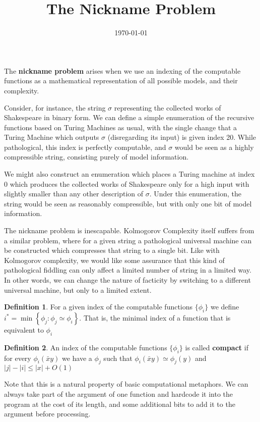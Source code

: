 \documentclass{article}
\title{The Nickname Problem}
\date{\today}
\theoremstyle{definition}
\newtheorem*{dfn}{Definition}
\begin{document}
\maketitle
The \textbf{nickname problem} arises when we use an indexing of the computable functions as a mathematical representation of all possible models, and their complexity. 

Consider, for instance, the string $\sigma$ representing the collected works of Shakespeare in binary form. We can define a simple enumeration of the recursive functions based on Turing Machines as usual, with the single change that a Turing Machine which outputs $\sigma$ (disregarding its input) is given index 20. While pathological, this index is perfectly computable, and $\sigma$ would be seen as a highly compressible string, consisting purely of model information. 

We might also construct an enumeration which places a Turing machine at index 0 which produces the collected works of Shakespeare only for a high input with slightly smaller than any other description of $\sigma$. Under this enumeration, the string would be seen as reasonably compressible, but with only one bit of model information.

The nickname problem is inescapable. Kolmogorov Complexity itself suffers from a similar problem, where for a given string a pathological universal machine can be constructed which compresses that string to a single bit. Like with Kolmogorov complexity, we would like some assurance that this kind of pathological fiddling can only affect a limited number of string in a limited way. In other words, we can change the nature of facticity by switching to a different universal machine, but only to a limited extent.

\begin{dfn}
For a given index of the computable functions $\{\phi_i\}$ we define $i^* = \min\left\{\phi_j : \phi_j \simeq \phi_i\right\}$. That is, the minimal index of a function that is equivalent to $\phi_i$
\end{dfn}

\begin{dfn}
An index of the computable functions $\{\phi_i\}$ is called \textbf{compact} if for every 
$\phi_i(\bar{x}y)$ we have a $\phi_j$ such that $\phi_i(\bar{x}y) \simeq \phi_j(y)$ and  $|j| - |i| \leq |x| + O(1)$
\end{dfn}

Note that this is a natural property of basic computational metaphors. We can always take part of the argument of one function and hardcode it into the program at the cost of its length, and some additional bits to add it to the argument before processing. 
\end{document}
